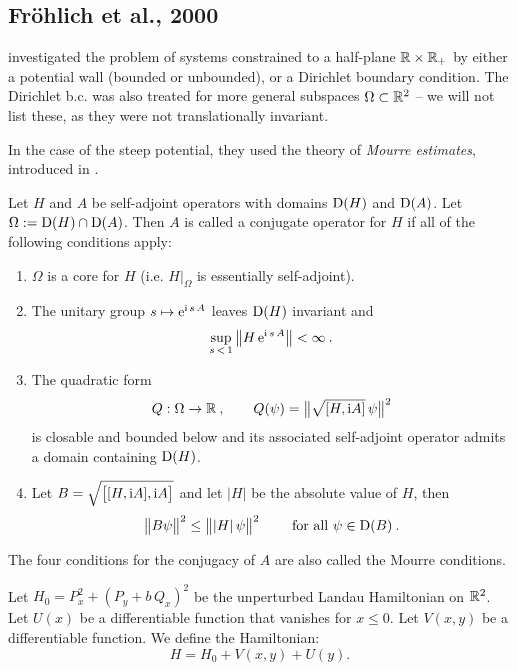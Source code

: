 \subsection{Fröhlich et al., 2000}
\cite{Frohlich2000} investigated the problem of systems constrained to a half-plane $\mathbb{R} \times \mathbb{R}_+$ by either a potential wall (bounded or unbounded), or a Dirichlet boundary condition. The Dirichlet b.c. was also treated for more general subspaces $\Omega \subset \mathbb{R}^2$ – we will not list these, as they were not translationally invariant.

In the case of the steep potential, they used the theory of \textit{Mourre estimates}, introduced in \cite{Mourre1981}.

\begin{defn}
    Let $H$ and $A$ be self-adjoint operators with domains $\mathrm{D}(H)$ and $\mathrm{D}(A)$. Let $\Omega := \mathrm{D}(H) \cap \mathrm{D}(A)$. Then $A$ is called a conjugate operator for $H$ if all of the following conditions apply:
    \begin{enumerate}
        \item $\Omega$ is a core for $H$ (i.e. $H|_\Omega$ is essentially self-adjoint).
        \item The unitary group $s \mapsto \mathrm{e}^{\mathrm{i} \, s \, A}$ leaves $\mathrm{D}(H)$ invariant and $$ \sup_{s\,<\,1} \big\lVert H \, \mathrm{e}^{\mathrm{i} \, s \, A} \big\rVert < \infty \: .$$
        \item The quadratic form $$Q: \Omega \to \mathbb{R} \: , \qquad Q(\psi) = \big\lVert  \sqrt{[ H, \mathrm{i} A ]} \, \psi  \big\rVert^2$$ is closable and bounded below and its associated self-adjoint operator admits a domain containing $\mathrm{D}(H)$.
        \item Let $B = \sqrt{\big[ [H, \mathrm{i} A], \mathrm{i} A \big]}$ and let $|H|$ be the absolute value of $H$, then $$\big\lVert  B \psi  \big\rVert^2 \leq \big\lVert  |H| \, \psi \big\rVert^2 \qquad \text{ for all } \psi \in \mathrm{D}(B) \: .$$
    \end{enumerate}
    The four conditions for the conjugacy of $A$ are also called the Mourre conditions.
\end{defn}

\begin{defn}
    Let $H_0 = P_x^2 + (P_y + b \, Q_x)^2$ be the unperturbed Landau Hamiltonian on $\mathbb{R}^2$. Let $U(x)$ be a differentiable function that vanishes for $x\leq 0$. Let $V(x,y)$ be a differentiable function. We define the Hamiltonian:
    $$ H = H_0 + V(x,y) + U(y). $$
\end{defn}

